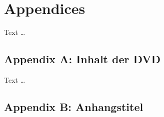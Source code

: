 \chapter*{Appendices}
\begin{comment}
Zusätzliche Informationen die zu lang für die Arbeit sind können hier verfügbar gemacht werden.

Aber auch an die DVD denken — was ist dort besser aufgehoben? Die Zeiten, in denen man Programmcode manuell eingetippt hat, sind ja glücklicherweise lange vorbei, deswegen macht Code hier wenig Sinn.

Ist entsprechend ein Priorisierung: Was würde sich der Leser vielleicht gerne während des Lesens der Arbeit (z. B. im Zug) ansehen, wenn er auch gerade nicht auf die DVD zugreifen kann (kein DVD Laufwerk)?

Inhalte sind oft: Überblick der Inhalte der DVD, Fragebögen (falls digital Screenshots oder neu für den Druck formatiert), Interviewleitfäden, etc. Selten detailliertere Evaluationsergebnisse.

Hier kurz die Zwischenüberschriften nennen und evtl. 1 Satz, was dort zu finden ist (falls es nicht schon durch die Zwischenüberschrift klar ist). 
\end{comment}

Text \dots

{}
\section*{Appendix A: Inhalt der DVD}
\begin{comment}
Oft ein Default: Was findet man auf der beiliegenden DVD in welchem Verzeichnis? Max. 1 Seite.

\textbf{In jedem Fall} die PDF der Arbeit, den Programmcode, Daten (anonymisiert!).

\textbf{Niemals} Interviewaufzeichnungen, Einverständniserklärungen oder ähnliche personenbezogene Daten auf die DVD brennen — Sie haben in den meisten Fällen Anonymität zugesichert und die DVD ist frei zugänglich (ein Exemplar der Arbeit kommt in die Bibliothek). 
\end{comment}

Text \dots

{}
\section*{Appendix B: Anhangstitel}
\begin{comment}
Weitere Inhalte je nachdem, wo der Leser ohne großen Aufwand hinspringen sollte.
\end{comment}

